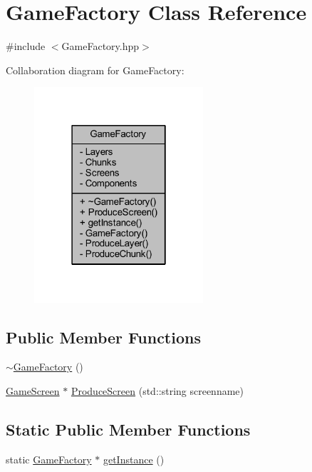 \hypertarget{class_game_factory}{\section{Game\-Factory Class Reference}
\label{class_game_factory}
}


{\ttfamily \#include $<$Game\-Factory.\-hpp$>$}



Collaboration diagram for Game\-Factory\-:
\nopagebreak
\begin{figure}[H]
\begin{center}
\leavevmode
\includegraphics[width=178pt]{class_game_factory__coll__graph}
\end{center}
\end{figure}
\subsection*{Public Member Functions}
\begin{DoxyCompactItemize}
\item 
\hyperlink{class_game_factory_a0cbbb4c198cab19386d67bfe7891b785}{$\sim$\-Game\-Factory} ()
\item 
\hyperlink{class_game_screen}{Game\-Screen} $\ast$ \hyperlink{class_game_factory_ad293f5a8811d9106753916cef819fbce}{Produce\-Screen} (std\-::string screenname)
\end{DoxyCompactItemize}
\subsection*{Static Public Member Functions}
\begin{DoxyCompactItemize}
\item 
static \hyperlink{class_game_factory}{Game\-Factory} $\ast$ \hyperlink{class_game_factory_af9b8ebc6daa14822ec704480afbc8494}{get\-Instance} ()
\end{DoxyCompactItemize}
